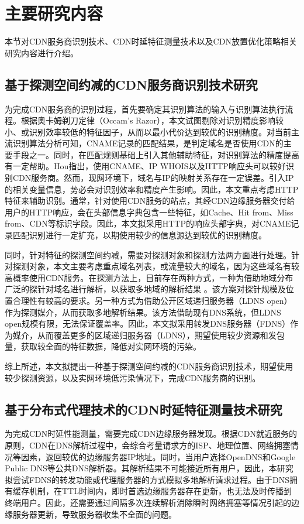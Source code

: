 
\section{主要研究内容}
本节对CDN服务商识别技术、CDN时延特征测量技术以及CDN放置优化策略相关研究内容进行介绍。


\subsection{基于探测空间约减的CDN服务商识别技术研究}

为完成CDN服务商的识别过程，首先要确定其识别算法的输入与识别算法执行流程。根据奥卡姆剃刀定律（Occam's Razor），本文试图剔除对识别精度影响较小、或识别效率较低的特征因子，从而以最小代价达到较优的识别精度。对当前主流识别算法分析可知，CNAME记录的匹配结果\cite{Huang2008,Adhikari2014,Guo2018}，是判定域名是否使用CDN的主要手段之一。同时，在匹配规则基础上引入其他辅助特征，对识别算法的精度提高有一定帮助。Hou\cite{Hou2021}指出，使用CNAME、IP WHOIS以及HTTP响应头可以较好识别CDN服务商。然而，现网环境下，域名与IP的映射关系存在一定误差\cite{Ma2021}。引入IP的相关变量信息，势必会对识别效率和精度产生影响。因此，本文重点考虑HTTP特征来辅助识别。通常，针对使用CDN服务的站点，其经CDN边缘服务器交付给用户的HTTP响应，会在头部信息字典包含一些特征，如Cache、Hit from、Miss from、CDN等标识字段。因此，本文拟采用HTTP的响应头部字典，对CNAME记录匹配识别进行一定扩充，以期使用较少的信息源达到较优的识别精度。


同时，针对特征的探测空间约减，需要对探测对象和探测方法两方面进行处理。针对探测对象，本文主要考虑重点域名列表，或流量较大的域名，因为这些域名有较高概率使用CDN服务。在探测方法上，目前存在两种方式，一种为借助地域分布广泛的探针对域名进行解析，以获取多地域的解析结果
。该方案对探针规模及位置合理性有较高的要求。另一种方式为借助公开区域递归服务器（LDNS open）作为探测媒介\cite{Huang2008}，从而获取多地解析结果。该方法借助现有DNS系统，但LDNS open规模有限，无法保证覆盖率。因此，本文拟采用转发DNS服务器（FDNS）作为媒介，从而覆盖更多的区域递归服务器（LDNS），期望使用较少资源和发包量，获取较全面的特征数据，降低对实网环境的污染。

综上所述，本文拟提出一种基于探测空间约减的CDN服务商识别技术，期望使用较少探测资源，以及实网环境低污染情况下，完成CDN服务商的识别。


\subsection{基于分布式代理技术的CDN时延特征测量技术研究}
为完成CDN时延性能测量，需要完成CDN边缘服务器发现。根据CDN就近服务的原则，CDN在DNS解析过程中，会综合考量请求方的ISP、地理位置、网络拥塞情况等因素，返回较优的边缘服务器IP地址。同时，当用户选择OpenDNS和Google Public DNS等公共DNS解析器。其解析结果不可能接近所有用户\cite{fu2018}，因此，本研究拟尝试FDNS的转发功能或代理服务器的方式模拟多地解析请求过程。由于DNS拥有缓存机制\cite{Moura2019}，在TTL时间内，即时首选边缘服务器存在更新，也无法及时传播到终端用户。因此，还需要通过间隔多次连续解析消除瞬时网络拥塞等情况引起的边缘服务器更新，导致服务器收集不全面的问题。

